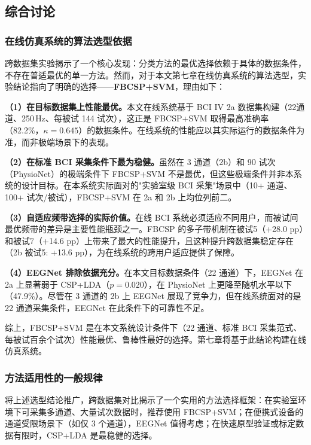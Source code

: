 \subsection{综合讨论}

\subsubsection{在线仿真系统的算法选型依据}

跨数据集实验揭示了一个核心发现：分类方法的最优选择依赖于具体的数据条件，不存在普适最优的单一方法。然而，对于本文第七章在线仿真系统的算法选型，实验结论指向了明确的选择——\textbf{FBCSP+SVM}，理由如下：

\textbf{（1）在目标数据集上性能最优。}本文在线系统基于 BCI IV 2a 数据集构建（22通道、250\,Hz、每被试 144 试次），这正是 FBCSP+SVM 取得最高准确率（82.2\%，$\kappa = 0.645$）的数据条件。在线系统的性能应以其实际运行的数据条件为准，而非极端场景下的表现。

\textbf{（2）在标准 BCI 采集条件下最为稳健。}虽然在 3 通道（2b）和 90 试次（PhysioNet）的极端条件下 FBCSP+SVM 不是最优，但这些极端条件并非本系统的设计目标。在本系统实际面对的"实验室级 BCI 采集"场景中（10+ 通道、100+ 试次/被试），FBCSP+SVM 在 2a 和 2b 上均位列前二。

\textbf{（3）自适应频带选择的实际价值。}在线 BCI 系统必须适应不同用户，而被试间最优频带的差异是主要性能瓶颈之一。FBCSP 的多子带机制在被试5（+28.0 pp）和被试7（+14.6 pp）上带来了最大的性能提升，且这种提升跨数据集稳定存在（2b 被试5: +13.6 pp），为在线系统的跨用户适应提供了保障。

\textbf{（4）EEGNet 排除依据充分。}在本文目标数据条件（22 通道）下，EEGNet 在 2a 上显著弱于 CSP+LDA（$p = 0.020$），在 PhysioNet 上更降至随机水平以下（47.9\%）。尽管在 3 通道的 2b 上 EEGNet 展现了竞争力，但在线系统面对的是 22 通道采集条件，EEGNet 在此条件下的可靠性不足。

综上，FBCSP+SVM 是在本文系统设计条件下（22 通道、标准 BCI 采集范式、每被试百余个试次）性能最优、鲁棒性最好的选择。第七章将基于此结论构建在线仿真系统。

\subsubsection{方法适用性的一般规律}

将上述选型结论推广，跨数据集对比揭示了一个实用的方法选择框架：在实验室环境下可采集多通道、大量试次数据时，推荐使用 FBCSP+SVM；在便携式设备的通道受限场景下（如仅 3 个通道），EEGNet 值得考虑；在快速原型验证或标定数据有限时，CSP+LDA 是最稳健的选择。


